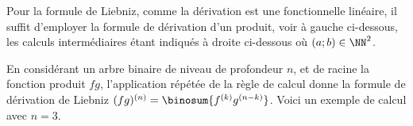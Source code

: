 Pour la formule de Liebniz, comme la dérivation est une fonctionnelle linéaire, il suffit d'employer la formule de dérivation d'un produit, voir à gauche ci-dessous, les calculs intermédiaires étant indiqués à droite ci-dessous où $(a;b) \in \NN^2$.

%
            {\intertree}{\prodder}


En considérant un arbre binaire de niveau de profondeur $n$, et de racine la fonction produit $f g$, l'application répétée de la règle de calcul donne la formule de dérivation de Liebniz 
$(fg)^{(n)} = \binosum{f^{(k)} g^{(n-k)}}$.
%
Voici un exemple de calcul avec $n=3$.

\binotree{\prodder}


